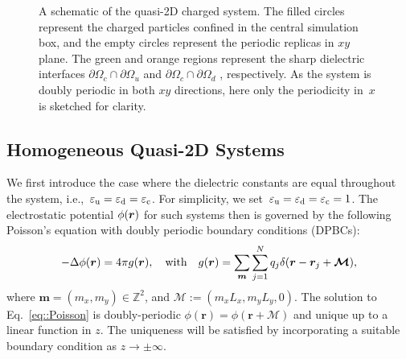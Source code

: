 \begin{figure}[htbp]
    \caption{
        A schematic of the quasi-2D charged system.
        The filled circles represent the charged particles confined in the central simulation box, and the empty circles represent the periodic replicas in $xy$ plane.
        The green and orange regions represent the sharp dielectric interfaces $\partial \Omega_c \cap \partial \Omega_{u}$ and $\partial \Omega_c \cap \partial \Omega_{d}$ , respectively.
        As the system is doubly periodic in both $xy$ directions, here only the periodicity in~$x$ is sketched for clarity.
    }
    \label{fig:box}
\end{figure}

\subsection{Homogeneous Quasi-2D Systems}

We first introduce the case where the dielectric constants are equal throughout the system, i.e.,~$\varepsilon_{\mathrm{u}} = \varepsilon_{\mathrm{d}} = \varepsilon_{\mathrm{c}}$. For simplicity, we set~$\varepsilon_{\mathrm{u}} = \varepsilon_{\mathrm{d}} = \varepsilon_{\mathrm{c}} = 1$.
The electrostatic potential $\phi(\boldsymbol{r})$ for such systems then is governed by the following Poisson's equation with doubly periodic boundary conditions (DPBCs):
\begin{equation}\label{eq::Poisson}
	-\Delta\phi(\bm{r}) = 4\pi g(\bm{r}), \quad \text{with} \quad g(\bm{r})= \sum_{\V{m}}\sum_{j=1}^{N}q_{j}\delta(\bm{r}-\bm{r}_{j}+\bm{\mathcal{M}}),%
\end{equation}
where $\bm{m}=(m_x,m_y) \in\mathbb{Z}^2$, and $\bm{\mathcal{M}} := (m_x L_x, m_y L_y, 0)$.
The solution to Eq.~\eqref{eq::Poisson} is doubly-periodic $\phi(\bm{r})=\phi(\bm{r} + \bm{\mathcal{M}})$ and unique up to a linear function in $z$. The uniqueness will be satisfied by incorporating a suitable boundary condition as $z\to\pm\infty$.

